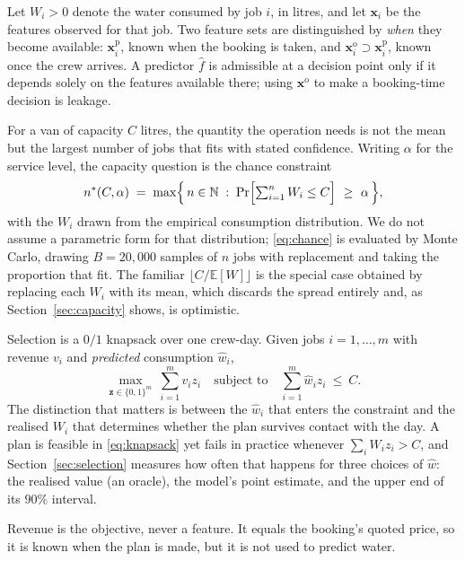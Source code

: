 \documentclass[conference]{IEEEtran}
\begin{document}
Let $W_i > 0$ denote the water consumed by job $i$, in litres, and let $\mathbf{x}_i$ be the
features observed for that job. Two feature sets are distinguished by \emph{when} they become
available: $\mathbf{x}^{\mathrm{p}}_i$, known when the booking is taken, and
$\mathbf{x}^{\mathrm{o}}_i \supset \mathbf{x}^{\mathrm{p}}_i$, known once the crew arrives.
A predictor $\hat{f}$ is admissible at a decision point only if it depends solely on the
features available there; using $\mathbf{x}^{\mathrm{o}}$ to make a booking-time decision is
leakage.

For a van of capacity $C$ litres, the quantity the operation needs is not the mean but the
largest number of jobs that fits with stated confidence. Writing $\alpha$ for the service
level, the capacity question is the chance constraint
\begin{equation}
n^{*}(C, \alpha) \;=\; \max \Bigl\{\, n \in \mathbb{N} \;:\;
\Pr\Bigl[ \textstyle\sum_{i=1}^{n} W_i \le C \Bigr] \ \ge\ \alpha \,\Bigr\},
\label{eq:chance}
\end{equation}
with the $W_i$ drawn from the empirical consumption distribution. We do not assume a
parametric form for that distribution; \eqref{eq:chance} is evaluated by Monte Carlo, drawing
$B = 20{,}000$ samples of $n$ jobs with replacement and taking the proportion that fit. The
familiar $\lfloor C / \mathbb{E}[W] \rfloor$ is the special case obtained by replacing each
$W_i$ with its mean, which discards the spread entirely and, as Section~\ref{sec:capacity}
shows, is optimistic.

Selection is a $0/1$ knapsack over one crew-day. Given jobs $i = 1, \dots, m$ with revenue
$v_i$ and \emph{predicted} consumption $\hat{w}_i$,
\begin{equation}
\max_{\mathbf{z} \in \{0,1\}^m} \ \sum_{i=1}^{m} v_i z_i
\quad \text{subject to} \quad \sum_{i=1}^{m} \hat{w}_i z_i \ \le\ C .
\label{eq:knapsack}
\end{equation}
The distinction that matters is between the $\hat{w}_i$ that enters the constraint and the
realised $W_i$ that determines whether the plan survives contact with the day. A plan is
feasible in \eqref{eq:knapsack} yet fails in practice whenever
$\sum_i W_i z_i > C$, and Section~\ref{sec:selection} measures how often that happens for
three choices of $\hat{w}$: the realised value (an oracle), the model's point estimate, and
the upper end of its $90\%$ interval.

Revenue is the objective, never a feature. It equals the booking's quoted price, so it is
known when the plan is made, but it is not used to predict water.
\end{document}
